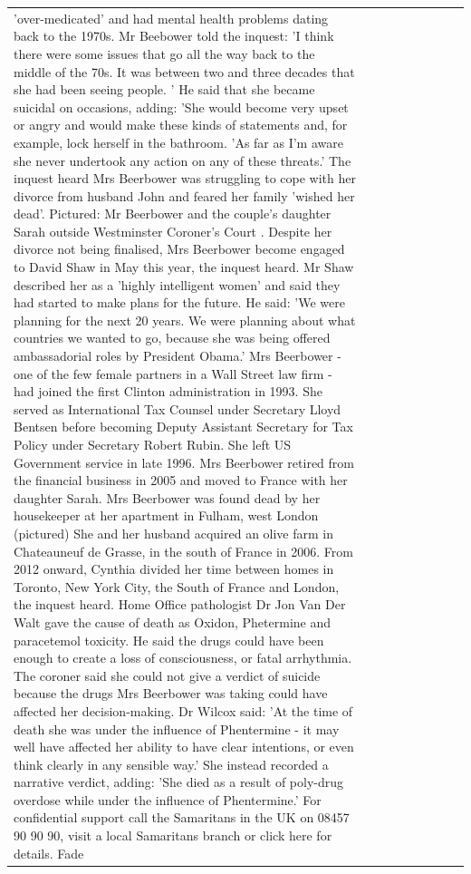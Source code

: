 \begin{table}[H]
\begin{tabular}{lllrlllll}
'over-medicated' and had mental health problems dating back to the 1970s. Mr Beebower told the inquest: 'I think there were some issues that go all the way back to the middle of the 70s. It was between two and three decades that she had been seeing people. ' He said that she became suicidal on occasions, adding: 'She would become very upset or angry and would make these kinds of statements and, for example, lock herself in the bathroom. 'As far as I'm aware she never undertook any action on any of these threats.' The inquest heard Mrs Beerbower was struggling to cope with her divorce from husband John and feared her family 'wished her dead'. Pictured: Mr Beerbower and the couple's daughter Sarah outside Westminster Coroner's Court . Despite her divorce not being finalised, Mrs Beerbower become engaged to David Shaw in May this year, the inquest heard. Mr Shaw described her as a 'highly intelligent women' and said they had started to make plans for the future. He said: 'We were planning for the next 20 years. We were planning about what countries we wanted to go, because she was being offered ambassadorial roles by President Obama.' Mrs Beerbower - one of the few female partners in a Wall Street law firm - had joined the first Clinton administration in 1993. She served as International Tax Counsel under Secretary Lloyd Bentsen before becoming Deputy Assistant Secretary for Tax Policy under Secretary Robert Rubin. She left US Government service in late 1996. Mrs Beerbower retired from the financial business in 2005 and moved to France with her daughter Sarah. Mrs Beerbower was found dead by her housekeeper at her apartment in Fulham, west London (pictured) She and her husband acquired an olive farm in Chateauneuf de Grasse, in the south of France in 2006. From 2012 onward, Cynthia divided her time between homes in Toronto, New York City, the South of France and London, the inquest heard. Home Office pathologist Dr Jon Van Der Walt gave the cause of death as Oxidon, Phetermine and paracetemol toxicity. He said the drugs could have been enough to create a loss of consciousness, or fatal arrhythmia. The coroner said she could not give a verdict of suicide because the drugs Mrs Beerbower was taking could have affected her decision-making. Dr Wilcox said: 'At the time of death she was under the influence of Phentermine - it may well have affected her ability to have clear intentions, or even think clearly in any sensible way.' She instead recorded a narrative verdict, adding: 'She died as a result of poly-drug overdose while under the influence of Phentermine.' For confidential support call the Samaritans in the UK on 08457 90 90 90, visit a local Samaritans branch or click here for details. Fade \\

\end{tabular}
\end{table}

